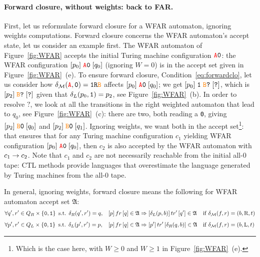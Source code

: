 \paragraph{Forward closure, without weights: back to FAR.} First, let us reformulate forward closure for a WFAR automaton, ignoring weights computations. Forward closure concerns the WFAR automaton's accept state, let us consider an example first. The WFAR automaton of Figure~\ref{fig:WFAR} accepts the initial Turing machine configuration $\texttt{\stateA}\szero$: the WFAR configuration $[p_0] \; \texttt{\stateA}\szero\; [q_0]$ (ignoring $W=0$) is in the accept set given in Figure~\ref{fig:WFAR}~(e). To ensure forward closure, Condition~\ref{eq:forwardclo}, let us consider how $\delta_\mathcal{M}(\texttt{\stateA},\szero) = \texttt{1R\stateB}$ affects $[p_0] \; \texttt{\stateA}\szero\; [q_0]$; we get $[p_0] \; \texttt{1}\; \texttt{\stateB}\texttt{?}\; [\texttt{?}]$, which is $[p_2] \; \texttt{\stateB}\texttt{?}\; [\texttt{?}]$ given that $\delta_L(p_0,\texttt{1}) = p_2$, see Figure~\ref{fig:WFAR}~(b). In order to resolve $\texttt{?}$, we look at all the transitions in the right weighted automaton that lead to $q_0$, see Figure~\ref{fig:WFAR}~(c): there are two, both reading a \texttt{0}, giving $[p_2] \; \texttt{\stateB}\texttt{0}\; [q_0]$ and $[p_2] \; \texttt{\stateB}\texttt{0}\; [q_1]$. Ignoring weights, we want both in the accept set\footnote{Which is the case here, with $W\geq 0$ and $W \geq 1$ in Figure~\ref{fig:WFAR}~(e).}: that ensures that for any Turing machine configuration $c_1$ yielding WFAR configuration $[p_0] \; \texttt{\stateA}\szero\; [q_0]$, then $c_2$ is also accepted by the WFAR automaton with $c_1 \to c_2$. Note that $c_1$ and $c_2$ are not necessarily reachable from the initial all-0 tape: CTL methods provide languages that overestimate the language generated by Turing machines from the all-0 tape.

In general, ignoring weights, forward closure means the following for WFAR automaton accept set $\mathfrak{A}$:
\begin{align}
     & \forall q', r' \in Q_R \times \left\{\texttt{0},\texttt{1}\right\} \text{ s.t. } \delta_R(q', r') = q,
     &                                                                              & [p]\, fr\, [q] \in \mathfrak{A} \Rightarrow [\delta_L(p,b)]\, tr'\, [q'] \in \mathfrak{A}
     &                                                                              & \text{if } \delta_{\mathcal{M}}(f,r) = (b, \text{R}, t) \label{eq:forwardcloR}
    \\[0.5em]
     & \forall p', r' \in Q_L\times \left\{\texttt{0},\texttt{1}\right\} \text{ s.t. } \delta_L(p', r') = p,
     &                                                                              & [p]\, fr\, [q] \in \mathfrak{A} \Rightarrow [p']\, tr'\, [\delta_R(q,b)] \in \mathfrak{A}
     &                                                                              & \text{if } \delta_{\mathcal{M}}(f,r) = (b, \text{L}, t) \label{eq:forwardcloL}
\end{align}

